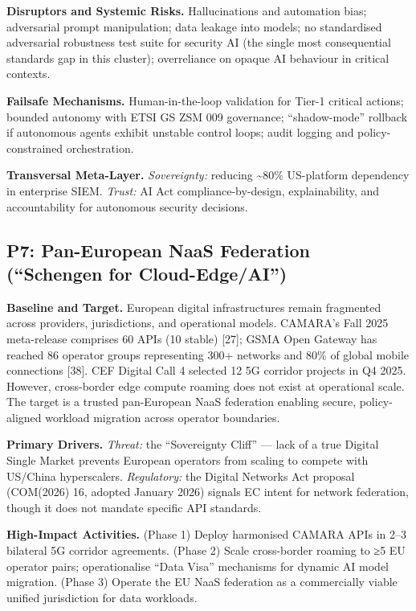 \documentclass{ieeeaccess}
\begin{document}
\textbf{Disruptors and Systemic Risks.} Hallucinations and automation
bias; adversarial prompt manipulation; data leakage into models; no
standardised adversarial robustness test suite for security AI (the
single most consequential standards gap in this cluster); overreliance
on opaque AI behaviour in critical contexts.

\textbf{Failsafe Mechanisms.} Human-in-the-loop validation for Tier-1
critical actions; bounded autonomy with ETSI GS ZSM 009 governance;
``shadow-mode'' rollback if autonomous agents exhibit unstable control
loops; audit logging and policy-constrained orchestration.

\textbf{Transversal Meta-Layer.} \emph{Sovereignty:} reducing
\textasciitilde80\% US-platform dependency in enterprise SIEM.
\emph{Trust:} AI Act compliance-by-design, explainability, and
accountability for autonomous security decisions.

\subsection{P7: Pan-European NaaS Federation (``Schengen for
Cloud-Edge/AI'')}\label{p7-pan-european-naas-federation-schengen-for-cloud-edgeai}

\textbf{Baseline and Target.} European digital infrastructures remain
fragmented across providers, jurisdictions, and operational models.
CAMARA's Fall 2025 meta-release comprises 60 APIs (10 stable) {[}27{]};
GSMA Open Gateway has reached 86 operator groups representing 300+
networks and 80\% of global mobile connections {[}38{]}. CEF Digital
Call 4 selected 12 5G corridor projects in Q4 2025. However,
cross-border edge compute roaming does not exist at operational scale.
The target is a trusted pan-European NaaS federation enabling secure,
policy-aligned workload migration across operator boundaries.

\textbf{Primary Drivers.} \emph{Threat:} the ``Sovereignty Cliff'' ---
lack of a true Digital Single Market prevents European operators from
scaling to compete with US/China hyperscalers. \emph{Regulatory:} the
Digital Networks Act proposal (COM(2026) 16, adopted January 2026)
signals EC intent for network federation, though it does not mandate
specific API standards.

\textbf{High-Impact Activities.} (Phase 1) Deploy harmonised CAMARA APIs
in 2--3 bilateral 5G corridor agreements. (Phase 2) Scale cross-border
roaming to ≥5 EU operator pairs; operationalise ``Data Visa'' mechanisms
for dynamic AI model migration. (Phase 3) Operate the EU NaaS federation
as a commercially viable unified jurisdiction for data workloads.
\end{document}
